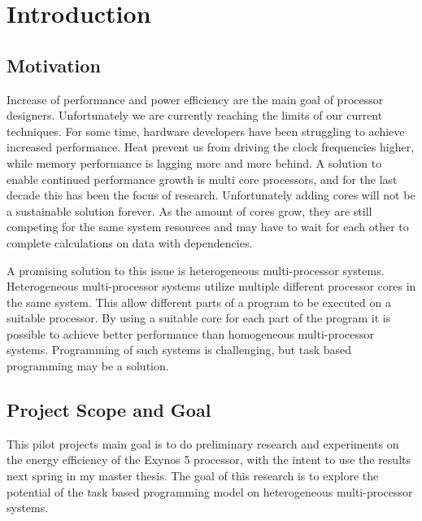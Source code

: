 \chapter[Introduction]{Introduction}
\section{Motivation}
Increase of performance and power efficiency are the main goal of processor designers.
Unfortunately we are currently reaching the limits of our current techniques.
For some time, hardware developers have been struggling to achieve increased performance.
Heat prevent us from driving the clock frequencies higher, while memory performance is lagging more and more behind.
A solution to enable continued performance growth is multi core processors, and for the last decade this has been the focus of research.
Unfortunately adding cores will not be a sustainable solution forever.
As the amount of cores grow, they are still competing for the same system resources and may have to wait for each other to complete calculations on data with dependencies.

A promising solution to this issue is heterogeneous multi-processor systems.
Heterogeneous multi-processor systems utilize multiple different processor cores in the same system.
This allow different parts of a program to be executed on a suitable processor.
By using a suitable core for each part of the program it is possible to achieve better performance than homogeneous multi-processor systems.
Programming of such systems is challenging, but task based programming may be a solution.

\section{Project Scope and Goal}
This pilot projects main goal is to do preliminary research and experiments on the energy efficiency of the Exynos 5 processor, with the intent to use the results next spring in my master thesis.
The goal of this research is to explore the potential of the task based programming model on heterogeneous multi-processor systems.


